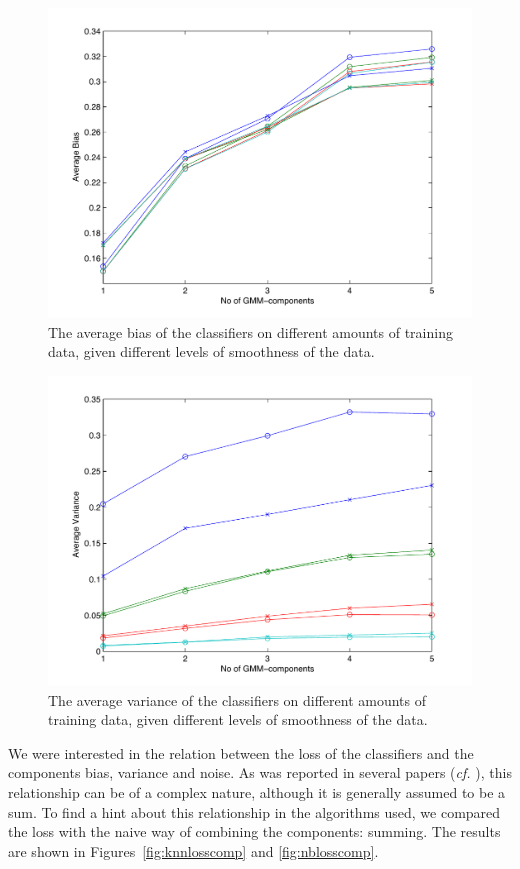 \documentclass[a4paper]{article}
\begin{document}
\begin{figure}[htb]
    \centering
    \includegraphics[width=.9\textwidth]{bias_vs.pdf}
    \caption{The average bias of the classifiers on different amounts of training data, given different levels of smoothness of the data. \label{fig:bias}}
\end{figure}

\begin{figure}[htb]
    \centering
    \includegraphics[width=.9\textwidth]{var_vs.pdf}
    \caption{The average variance of the classifiers on different amounts of training data, given different levels of smoothness of the data. \label{fig:var}}
\end{figure}

We were interested in the relation between the loss of the classifiers and the components bias, variance and noise. As was reported in several papers (\emph{cf.} \cite{Domingos2000}), this relationship can be of a complex nature, although it is generally assumed to be a sum. To find a hint about this relationship in the algorithms used, we compared the loss with the naive way of combining the components: summing. The results are shown in Figures~\ref{fig:knnlosscomp} and \ref{fig:nblosscomp}.
\end{document}
